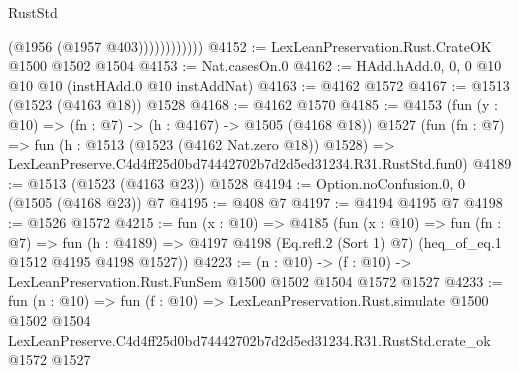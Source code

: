 \begin{lexlean}{RustStd}
\begin{coremodule}
                        (@1956 (@1957 @403))))))))))))
@4152 := LexLeanPreservation.Rust.CrateOK @1500 @1502 @1504
@4153 := Nat.casesOn.{0}
@4162 := HAdd.hAdd.{0, 0, 0} @10 @10 @10 (instHAdd.{0} @10 instAddNat)
@4163 := @4162 @1572
@4167 := @1513 (@1523 (@4163 @18)) @1528
@4168 := @4162 @1570
@4185 := @4153
    (fun (y : @10) => (fn : @7) -> (h : @4167) -> @1505 (@4168 @18))
    @1527
    (fun (fn : @7) =>
    fun (h : @1513 (@1523 (@4162 Nat.zero @18)) @1528) =>
    LexLeanPreserve.C4d4ff25d0bd74442702b7d2d5ed31234.R31.RustStd.fun0)
@4189 := @1513 (@1523 (@4163 @23)) @1528
@4194 := Option.noConfusion.{0, 0} (@1505 (@4168 @23)) @7
@4195 := @408 @7
@4197 := @4194 @4195 @7
@4198 := @1526 @1572
@4215 := fun (x : @10) =>
  @4185
    (fun (x : @10) =>
    fun (fn : @7) =>
    fun (h : @4189) =>
    @4197 @4198 (Eq.refl.{2} (Sort 1) @7) (heq_of_eq.{1} @1512 @4195 @4198 @1527))
@4223 := (n : @10) -> (f : @10) -> LexLeanPreservation.Rust.FunSem @1500 @1502 @1504 @1572 @1527
@4233 := fun (n : @10) =>
  fun (f : @10) =>
  LexLeanPreservation.Rust.simulate
    @1500
    @1502
    @1504
    LexLeanPreserve.C4d4ff25d0bd74442702b7d2d5ed31234.R31.RustStd.crate_ok
    @1572
    @1527
\end{coremodule}
\end{lexlean}

